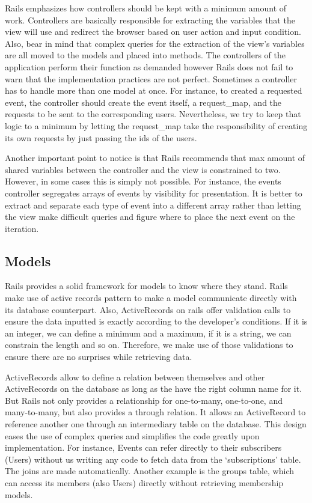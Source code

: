 \documentclass[11pt]{article}
\begin{document}
Rails emphasizes how controllers should be kept with a minimum amount of work. Controllers are basically responsible for extracting the variables that the view will use and redirect the browser based on user action and input condition. Also, bear in mind that complex queries for the extraction of the view’s variables are all moved to the models and placed into methods. The controllers of the application perform their function as demanded however Rails does not fail to warn that the implementation practices are not perfect. Sometimes a controller has to handle more than one model at once. For instance, to created a requested event, the controller should create the event itself, a request\_map, and the requests to be sent to the corresponding users. Nevertheless, we try to keep that logic to a minimum by letting the request\_map take the responsibility of creating its own requests by just passing the ids of the users.

Another important point to notice is that Rails recommends that max amount of shared variables between the controller and the view is constrained to two. However, in some cases this is simply not possible. For instance, the events controller segregates arrays of events by visibility for presentation. It is better to extract and separate each type of event into a different array rather than letting the view make difficult queries and figure where to place the next event on the iteration.

\subsection{Models}

Rails provides a solid framework for models to know where they stand. Rails make use of active records pattern to make a model communicate directly with its database counterpart. Also, ActiveRecords on rails offer validation calls to ensure the data inputted is exactly according to the developer’s conditions. If it is an integer, we can define a minimum and a maximum, if it is a string, we can constrain the length and so on. Therefore, we make use of those validations to ensure there are no surprises while retrieving data.

ActiveRecords allow to define a relation between themselves and other ActiveRecords on the database as long as the have the right column name for it. But Rails not only provides a relationship for one-to-many, one-to-one, and many-to-many, but also provides a through relation. It allows an ActiveRecord to reference another one through an intermediary table on the database. This design eases the use of complex queries and simplifies the code greatly upon implementation. For instance, Events can refer directly to their subscribers (Users) without us writing any code to fetch data from the ‘subscriptions’ table. The joins are made automatically. Another example is the groups table, which can access its members (also Users) directly without retrieving membership models.
\end{document}
